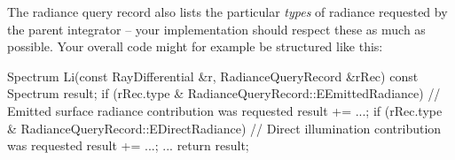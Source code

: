 The radiance query record also lists the particular \emph{types} of radiance requested
by the parent integrator -- your implementation should respect these as much
as possible. Your overall code might for example be structured like this:

\begin{cpp}
   Spectrum Li(const RayDifferential &r, RadianceQueryRecord &rRec) const {
      Spectrum result;
      if (rRec.type & RadianceQueryRecord::EEmittedRadiance) {
         // Emitted surface radiance contribution was requested
         result += ...;
      }
      if (rRec.type & RadianceQueryRecord::EDirectRadiance) {
         // Direct illumination contribution was requested
         result += ...;
      }
      ...
      return result;
   }
\end{cpp}
